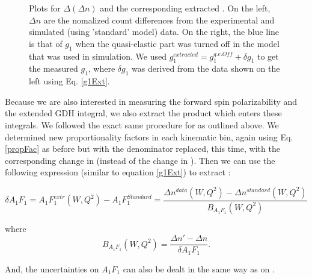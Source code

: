\begin{figure}[h]
{\label{g1q7}
}
\label{dDnCSng1q7} %
\caption[Optional caption for list of figures]{Plots for $\Delta (\Delta n)$ and the corresponding extracted \gone. On the left, $\Delta n$ are the nomalized count differences from the experimental and simulated (using 'standard' model) data. On the right, the blue line is that of $g_1$ when the quasi-elastic part was turned off in the model that was used in simulation. We used $g_1^{extracted} = g_1^{q.e. Off} + \delta g_1$ to get the measured $g_1$, where $\delta g_1$ was derived from the data shown on the left using Eq. \ref{g1Ext}.}
\end{figure}





Because we are also interested in measuring the forward spin polarizability and the extended GDH integral, we also extract the product \afones which enters these integrals. We followed the exact same procedure for \gones as outlined above. %
We determined new proportionality factors in each kinematic bin, again using Eq. \ref{propFac} as before but with the denominator replaced, this time, with the corresponding change in \afones (instead of the change in \gone). Then we can use the following expression (similar to equation \ref{g1Ext}) to extract \afonewq:

\begin{equation}
\label{a1f1Ext}
\delta A_{1}F_{1} = A_{1}F_{1}^{extr}(W,Q^2) - A_{1}F_{1}^{Standard} = \frac{\Delta n^{data}(W,Q^2) - \Delta n^{standard}(W,Q^2)}{B_{A_1F_1}(W,Q^2) }
\end{equation}

where
\begin{equation}
\label{propFac}
B_{A_1F_1}(W,Q^2)  = \frac{\Delta n' - \Delta n}{\delta A_1F_1}.
\end{equation}

And, the uncertainties on $A_1F_1$ can also be dealt in the same way as on \gone.






